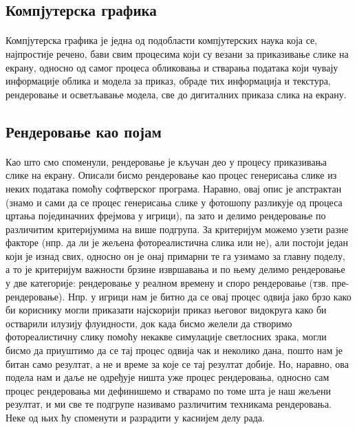 \documentclass[12pt]{article}
\begin{document}
	\subsection{Компјутерска графика}
	\paragraph{}
	Компјутерска графика је једна од подобласти компјутерских наука која се, најпростије речено, бави свим процесима који су везани за приказивање слике на екрану, односно од самог процеса обликовања и стварања података који чувају информације облика и модела за приказ, обраде тих информација и текстура, рендеровање и осветљавање модела, све до дигиталних приказа слика на екрану.
	\subsection{Рендеровање као појам}
	\paragraph{}
	Као што смо споменули, рендеровање је кључан део у процесу приказивања слике на екрану. Описали бисмо рендеровање као процес генерисања слике из неких података помоћу софтверског програма. Наравно, овај опис је апстрактан (знамо и сами да се процес генерисања слике у фотошопу разликује од процеса цртања појединачних фрејмова у игрици), па зато и делимо рендеровање по различитим критеријумима на више подгрупа. За критеријум можемо узети разне факторе (нпр. да ли је жељена фотореалистична слика или не), али постоји један који је изнад свих, односно он је онај примарни те га узимамо за главну поделу, а то је критеријум важности брзине извршавања и по њему делимо рендеровање у две категорије: рендеровање у реалном времену и споро рендеровање (тзв. пре-рендеровање). Нпр. у игрици нам је битно да се овај процес одвија јако брзо како би кориснику могли приказати најскорији приказ његовог видокруга како би остварили илузију флуидности, док када бисмо желели да створимо фотореалистичну слику помоћу некакве симулације светлосних зрака, могли бисмо да приуштимо да се тај процес одвија чак и неколико дана, пошто нам је битан само резултат, а не и време за које се тај резултат добије. Но, наравно, ова подела нам и даље не одређује ништа уже процес рендеровања, односно сам процес рендеровања ми дефинишемо и стварамо по томе шта је наш жељени резултат, и ми све те подгрупе називамо различитим техникама рендеровања. Неке од њих ћу споменути и разрадити у каснијем делу рада.
	
\end{document}
